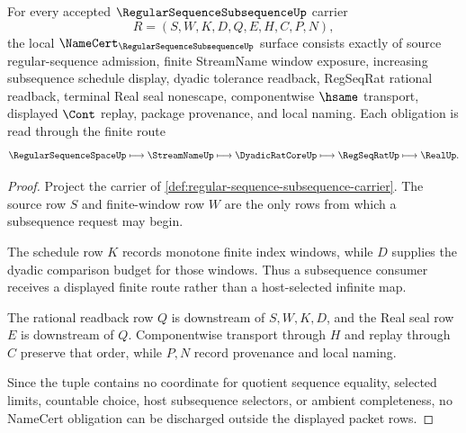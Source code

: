 \begin{theorem}
\label{thm:regular-sequence-subsequence-namecert-obligations}
For every accepted $\RegularSequenceSubsequenceUp$ carrier
$$
R=(S,W,K,D,Q,E,H,C,P,N),
$$
the local $\NameCert_{\RegularSequenceSubsequenceUp}$ surface consists exactly of source regular-sequence admission, finite StreamName window exposure, increasing subsequence schedule display, dyadic tolerance readback, RegSeqRat rational readback, terminal Real seal nonescape, componentwise $\hsame$ transport, displayed $\Cont$ replay, package provenance, and local naming. Each obligation is read through the finite route
$$
\RegularSequenceSpaceUp \longmapsto \StreamNameUp \longmapsto \DyadicRatCoreUp \longmapsto \RegSeqRatUp \longmapsto \RealUp .
$$
\end{theorem}
\begin{proof}
Project the carrier of \autoref{def:regular-sequence-subsequence-carrier}. The source row $S$ and finite-window row $W$ are the only rows from which a subsequence request may begin.

The schedule row $K$ records monotone finite index windows, while $D$ supplies the dyadic comparison budget for those windows. Thus a subsequence consumer receives a displayed finite route rather than a host-selected infinite map.

The rational readback row $Q$ is downstream of $S,W,K,D$, and the Real seal row $E$ is downstream of $Q$. Componentwise transport through $H$ and replay through $C$ preserve that order, while $P,N$ record provenance and local naming.

Since the tuple contains no coordinate for quotient sequence equality, selected limits, countable choice, host subsequence selectors, or ambient completeness, no NameCert obligation can be discharged outside the displayed packet rows.
\end{proof}

